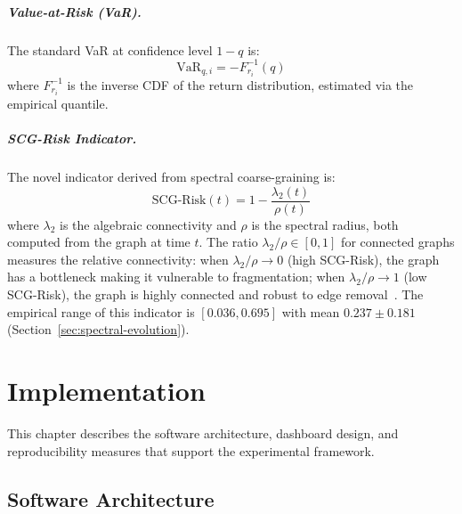 \paragraph{Value-at-Risk (VaR).}
The standard VaR at confidence level $1-q$ is:
\begin{equation}
    \text{VaR}_{q,i} = -F_{r_i}^{-1}(q)
    \label{eq:var}
\end{equation}
where $F_{r_i}^{-1}$ is the inverse CDF of the return distribution, estimated via the empirical quantile.

\paragraph{SCG-Risk Indicator.}
The novel indicator derived from spectral coarse-graining is:
\begin{equation}
    \text{SCG-Risk}(t) = 1 - \frac{\lambda_2(t)}{\rho(t)}
    \label{eq:scg-risk}
\end{equation}
where $\lambda_2$ is the algebraic connectivity and $\rho$ is the spectral radius, both computed from the graph at time $t$. The ratio $\lambda_2/\rho \in [0, 1]$ for connected graphs measures the relative connectivity: when $\lambda_2/\rho \to 0$ (high SCG-Risk), the graph has a bottleneck making it vulnerable to fragmentation; when $\lambda_2/\rho \to 1$ (low SCG-Risk), the graph is highly connected and robust to edge removal~\cite{fiedler1973algebraic,estrada2015first}. The empirical range of this indicator is $[0.036, 0.695]$ with mean $0.237 \pm 0.181$ (Section~\ref{sec:spectral-evolution}).


\chapter{Implementation}
\label{ch:implementation}

This chapter describes the software architecture, dashboard design, and reproducibility measures that support the experimental framework.


\section{Software Architecture}
\label{sec:software}

